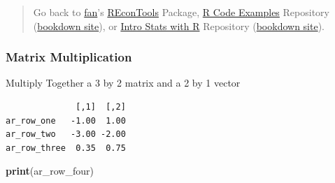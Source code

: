 \documentclass[
]{book}
\newenvironment{Shaded}{\begin{snugshade}}{\end{snugshade}}
\newcommand{\CommentTok}[1]{\textcolor[rgb]{0.56,0.35,0.01}{\textit{#1}}}
\newcommand{\DecValTok}[1]{\textcolor[rgb]{0.00,0.00,0.81}{#1}}
\newcommand{\FloatTok}[1]{\textcolor[rgb]{0.00,0.00,0.81}{#1}}
\newcommand{\KeywordTok}[1]{\textcolor[rgb]{0.13,0.29,0.53}{\textbf{#1}}}
\newcommand{\NormalTok}[1]{#1}
\newcommand{\OperatorTok}[1]{\textcolor[rgb]{0.81,0.36,0.00}{\textbf{#1}}}
\newcommand{\StringTok}[1]{\textcolor[rgb]{0.31,0.60,0.02}{#1}}
\begin{document}
\begin{quote}
Go back to \href{http://fanwangecon.github.io/}{fan}'s \href{https://fanwangecon.github.io/REconTools/}{REconTools} Package, \href{https://fanwangecon.github.io/R4Econ/}{R Code Examples} Repository (\href{https://fanwangecon.github.io/R4Econ/bookdown}{bookdown site}), or \href{https://fanwangecon.github.io/Stat4Econ/}{Intro Stats with R} Repository (\href{https://fanwangecon.github.io/Stat4Econ/bookdown}{bookdown site}).
\end{quote}

\hypertarget{matrix-multiplication}{%
\subsubsection{Matrix Multiplication}\label{matrix-multiplication}}

Multiply Together a 3 by 2 matrix and a 2 by 1 vector

\begin{Shaded}
\end{Shaded}

\begin{verbatim}
              [,1]  [,2]
ar_row_one   -1.00  1.00
ar_row_two   -3.00 -2.00
ar_row_three  0.35  0.75
\end{verbatim}

\begin{Shaded}
\begin{Highlighting}[]
\KeywordTok{print}\NormalTok{(ar_row_four)}
\end{Highlighting}
\end{Shaded}
\end{document}
